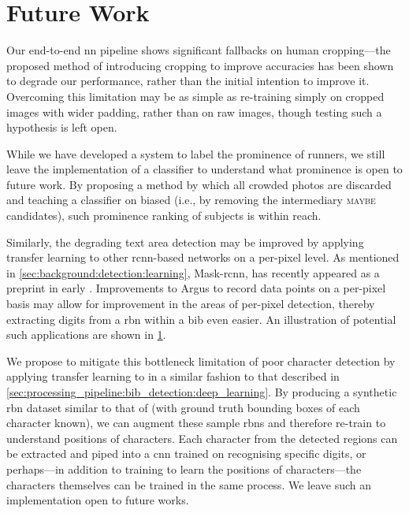 

\section{Future Work}

Our end-to-end \gls{nn} pipeline shows significant fallbacks on human cropping---the proposed method of introducing cropping to improve accuracies has been shown to degrade our performance, rather than the initial intention to improve it. Overcoming this limitation may be as simple as re-training \frcnn{} simply on cropped images with wider padding, rather than on raw images, though testing such a hypothesis is left open.

While we have developed a system to label the prominence of runners, we still leave the implementation of a classifier to understand what prominence is open to future work. By proposing a method by which all crowded photos are discarded and teaching a classifier on biased  (i.e., by removing the intermediary \textsc{maybe} candidates), such prominence ranking of subjects is within reach.

Similarly, the degrading text area detection may be improved by applying transfer learning to other \gls{rcnn}-based networks on a per-pixel level. As mentioned in \cref{sec:background:detection:learning}, Mask-\gls{rcnn}, has recently appeared as a preprint in early \citeyear{He:2017ud}. Improvements to Argus to record data points on a per-pixel basis may allow for improvement in the areas of per-pixel detection, thereby extracting digits from a \gls{rbn} within a bib even easier. An illustration of potential such applications are shown in \cref{}.

We propose to mitigate this bottleneck limitation of poor character detection by applying transfer learning to \frcnn{} in a similar fashion to that described in \cref{sec:processing_pipeline:bib_detection:deep_learning}. By producing a synthetic \gls{rbn} dataset similar to that of \citet{Jaderberg:2014uy,Jaderberg:2016wj} (with ground truth bounding boxes of each character known), we can augment these sample \glspl{rbn} and therefore re-train \frcnn{} to understand positions of characters. Each character from the detected regions can be extracted and piped into a \gls{cnn} trained on recognising specific digits, or perhaps---in addition to training \frcnn{} to learn the positions of characters---the characters themselves can be trained in the same process. We leave such an implementation open to future works.

